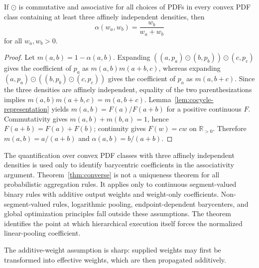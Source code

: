 \documentclass[runningheads]{llncs}
\newcommand{\R}{\mathbb{R}}
\begin{document}
\begin{theorem}
\label{thm:converse}
If $\odot$ is commutative and associative for all choices of PDFs in every convex PDF class containing at least three affinely independent densities, then
\begin{equation}
  \alpha(w_a,w_b)=\frac{w_b}{w_a+w_b}
  \label{eq:forced-alpha}
\end{equation}
for all $w_a,w_b>0$.
\end{theorem}

\begin{proof}
Let $m(a,b)=1-\alpha(a,b)$. Expanding
$((a,p_a)\odot(b,p_b))\odot(c,p_c)$ gives the coefficient of $p_a$ as
$m(a,b)m(a+b,c)$, whereas expanding
$(a,p_a)\odot((b,p_b)\odot(c,p_c))$ gives the coefficient of $p_a$ as
$m(a,b+c)$. Since the three densities are affinely independent, equality of
the two parenthesizations implies
$m(a,b)m(a+b,c)=m(a,b+c)$. Lemma~\ref{lem:cocycle-representation} yields
$m(a,b)=F(a)/F(a+b)$ for a positive continuous $F$. Commutativity gives
$m(a,b)+m(b,a)=1$, hence $F(a+b)=F(a)+F(b)$; continuity gives
$F(w)=cw$ on $\R_{>0}$. Therefore $m(a,b)=a/(a+b)$ and
$\alpha(a,b)=b/(a+b)$.
\end{proof}

The quantification over convex PDF classes with three affinely independent
densities is used only to identify barycentric coefficients in the associativity
argument. Theorem~\ref{thm:converse} is not a uniqueness theorem for all
probabilistic aggregation rules. It applies only to continuous segment-valued
binary rules with additive output weights and weight-only coefficients.
Non-segment-valued rules, logarithmic pooling, endpoint-dependent barycenters,
and global optimization principles fall outside these assumptions.
The theorem identifies the point at which hierarchical execution itself forces the normalized linear-pooling coefficient.

The additive-weight assumption is sharp: supplied weights may first be
transformed into effective weights, which are then propagated additively.
\end{document}
